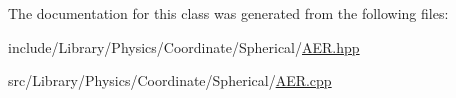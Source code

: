 The documentation for this class was generated from the following files\+:\begin{DoxyCompactItemize}
\item 
include/\+Library/\+Physics/\+Coordinate/\+Spherical/\hyperlink{_a_e_r_8hpp}{A\+E\+R.\+hpp}\item 
src/\+Library/\+Physics/\+Coordinate/\+Spherical/\hyperlink{_a_e_r_8cpp}{A\+E\+R.\+cpp}\end{DoxyCompactItemize}
